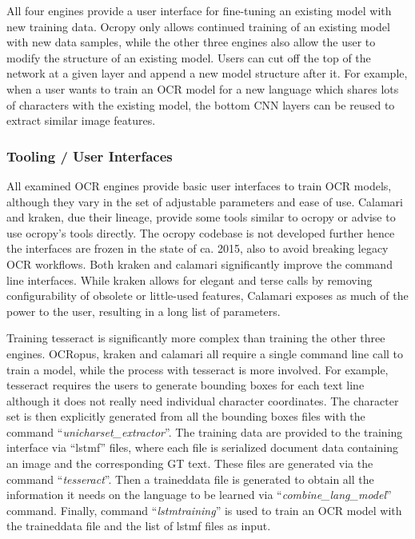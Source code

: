 \documentclass[conference]{IEEEtran}
\begin{document}
All four engines provide a user interface for fine-tuning an
existing model with new training data. Ocropy only allows
continued training of an existing model with new data samples,
while the other three engines also allow the user to modify the
structure of an existing model. Users can cut off the top of the 
network at a given layer and append a new model structure after it.
For example, when a user wants to train an OCR model for a new
language which shares lots of characters with the existing model,
the bottom CNN layers can be reused to extract similar image
features.


\subsubsection{Tooling / User Interfaces}

All examined OCR engines provide basic user interfaces to
train OCR models, although they vary in the set of adjustable
parameters and ease of use. Calamari and kraken, due their lineage,
provide some tools similar to ocropy or advise to use ocropy's tools
directly. The ocropy codebase is not developed further hence the interfaces
are frozen in the state of ca. 2015, also to avoid breaking legacy OCR
workflows. Both kraken and calamari significantly improve the command
line interfaces. While kraken allows for elegant and terse calls by
removing configurability of obsolete or little-used features, Calamari
exposes as much of the power to the user, resulting in a long list
of parameters.


Training tesseract is
significantly more complex than training the other three engines. OCRopus,
kraken and calamari all require a single command line call to train
a model, while the process with tesseract is more involved.
For example, tesseract requires the users
to generate bounding boxes for each text line although it does not
really need individual character coordinates. The character set is then
explicitly generated from all the bounding boxes files with the
command ``\textit{unicharset\_extractor}''. The training data are
provided to the training interface via ``lstmf'' files, where each
file is serialized document data containing an image and the
corresponding GT text. These files are generated via the
command ``\textit{tesseract}''. Then a traineddata file is generated
to obtain all the information it needs on the language to be
learned via ``\textit{combine\_lang\_model}'' command. Finally,
command ``\textit{lstmtraining}'' is used to train an OCR model with
the traineddata file and the list of lstmf files as input.
\end{document}
